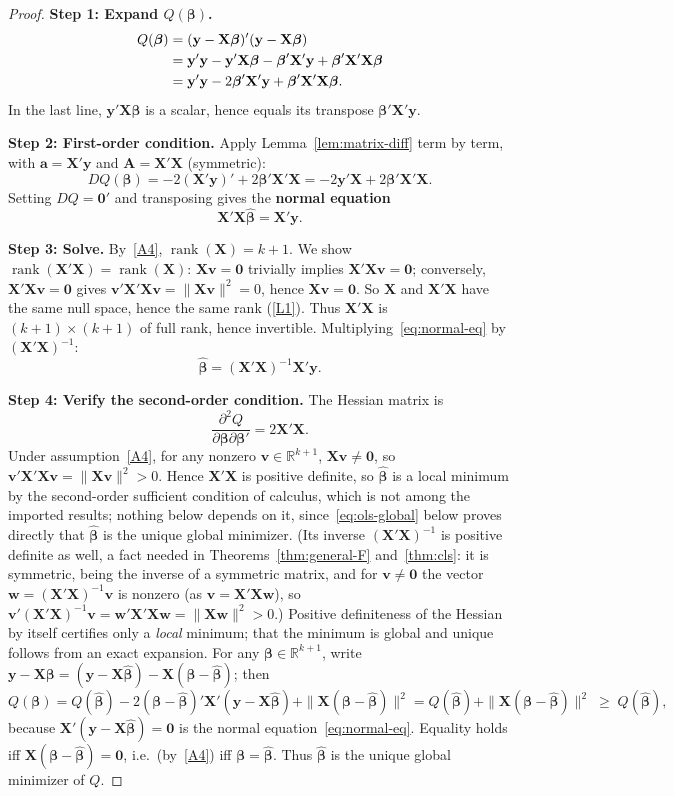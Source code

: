 \documentclass[14pt]{extarticle}
\theoremstyle{plain}
\theoremstyle{definition}
\theoremstyle{remark}
\DeclareMathOperator\rank{rank}
\newcommand{\bX}{\mathbf{X}}
\newcommand{\by}{\mathbf{y}}
\def\bb{\boldsymbol{\beta}}
\newcommand{\bzero}{\mathbf{0}}
\newcommand{\bw}{\mathbf{w}}
\newcommand{\bA}{\mathbf{A}}
\newcommand{\ba}{\mathbf{a}}
\newcommand{\bv}{\mathbf{v}}
\newcommand{\Real}{\mathbb{R}}
\begin{document}
\begin{proof}
\textbf{Step 1: Expand $Q(\bb)$.}
\begin{align}
Q(\bb) &= (\by - \bX\bb)'(\by - \bX\bb) \notag\\
&= \by'\by - \by'\bX\bb - \bb'\bX'\by + \bb'\bX'\bX\bb \notag\\
&= \by'\by - 2\bb'\bX'\by + \bb'\bX'\bX\bb.
\end{align}
In the last line, $\by'\bX\bb$ is a scalar, hence equals its transpose $\bb'\bX'\by$.

\textbf{Step 2: First-order condition.} Apply Lemma~\ref{lem:matrix-diff} term by term, with $\ba = \bX'\by$ and $\bA = \bX'\bX$ (symmetric):
\[
DQ(\bb) = -2(\bX'\by)' + 2\bb'\bX'\bX = -2\by'\bX + 2\bb'\bX'\bX.
\]
Setting $DQ = \bzero'$ and transposing gives the \textbf{normal equation}
\begin{equation}\label{eq:normal-eq}
\bX'\bX\hat{\bb} = \bX'\by.
\end{equation}

\textbf{Step 3: Solve.} By~\ref{A4}, $\rank(\bX) = k+1$. We show $\rank(\bX'\bX) = \rank(\bX)$: $\bX\bv = \bzero$ trivially implies $\bX'\bX\bv = \bzero$; conversely, $\bX'\bX\bv = \bzero$ gives $\bv'\bX'\bX\bv = \|\bX\bv\|^2 = 0$, hence $\bX\bv = \bzero$. So $\bX$ and $\bX'\bX$ have the same null space, hence the same rank (\ref{L1}). Thus $\bX'\bX$ is $(k+1) \times (k+1)$ of full rank, hence invertible. Multiplying~\eqref{eq:normal-eq} by $(\bX'\bX)^{-1}$:
\[
\hat{\bb} = (\bX'\bX)^{-1}\bX'\by.
\]

\textbf{Step 4: Verify the second-order condition.} The Hessian matrix is
\[
\frac{\partial^2 Q}{\partial \bb \partial \bb'} = 2\bX'\bX.
\]
Under assumption~\ref{A4}, for any nonzero $\bv \in \Real^{k+1}$, $\bX\bv \neq \bzero$, so $\bv'\bX'\bX\bv = \|\bX\bv\|^2 > 0$. Hence $\bX'\bX$ is positive definite, so $\hat{\bb}$ is a local minimum by the second-order sufficient condition of calculus, which is not among the imported results; nothing below depends on it, since~\eqref{eq:ols-global} below proves directly that $\hat{\bb}$ is the unique global minimizer. (Its inverse $(\bX'\bX)^{-1}$ is positive definite as well, a fact needed in Theorems~\ref{thm:general-F} and~\ref{thm:cls}: it is symmetric, being the inverse of a symmetric matrix, and for $\bv \neq \bzero$ the vector $\bw = (\bX'\bX)^{-1}\bv$ is nonzero (as $\bv = \bX'\bX\bw$), so $\bv'(\bX'\bX)^{-1}\bv = \bw'\bX'\bX\bw = \|\bX\bw\|^2 > 0$.) Positive definiteness of the Hessian by itself certifies only a \emph{local} minimum; that the minimum is global and unique follows from an exact expansion. For any $\bb \in \Real^{k+1}$, write $\by - \bX\bb = (\by - \bX\hat{\bb}) - \bX(\bb - \hat{\bb})$; then
\begin{equation}\label{eq:ols-global}
Q(\bb) = Q(\hat{\bb}) - 2(\bb - \hat{\bb})'\bX'(\by - \bX\hat{\bb}) + \|\bX(\bb - \hat{\bb})\|^2 = Q(\hat{\bb}) + \|\bX(\bb - \hat{\bb})\|^2 \;\geqslant\; Q(\hat{\bb}),
\end{equation}
because $\bX'(\by - \bX\hat{\bb}) = \bzero$ is the normal equation~\eqref{eq:normal-eq}. Equality holds iff $\bX(\bb - \hat{\bb}) = \bzero$, i.e.\ (by~\ref{A4}) iff $\bb = \hat{\bb}$. Thus $\hat{\bb}$ is the unique global minimizer of $Q$.
\end{proof}
\end{document}
